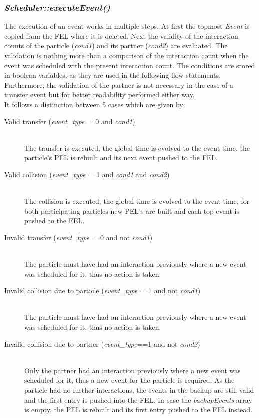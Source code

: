 \subsubsection{\quad \textit{Scheduler::executeEvent()}}
The execution of an event works in multiple steps. At first the topmost \textit{Event} is copied from the FEL where it is deleted. Next the validity of the interaction counts of the particle (\textit{cond1}) and its partner (\textit{cond2}) are evaluated. The validation is nothing more than a comparison of the interaction count when the event was scheduled with the present interaction count. The conditions are stored in boolean variables, as they are used in the following flow statements. Furthermore, the validation of the partner is not necessary in the case of a transfer event but for better readability performed either way.\\
It follows a distinction between 5 cases which are given by:
\begin{description}
\item[Valid transfer (\textit{event\_type}==0 and \textit{cond1}) ] \hfill \\ The transfer is executed, the global time is evolved to the event time, the particle's PEL is rebuilt and its next event pushed to the FEL.
\item[Valid collision (\textit{event\_type}==1 and \textit{cond1} and \textit{cond2}) ]\hfill \\ The collision is executed, the global time is evolved to the event time, for both participating particles new PEL's are built and each top event is pushed to the FEL.
\item[Invalid transfer (\textit{event\_type}==0 and not \textit{cond1})] \hfill \\ The particle must have had an interaction previously where a new event was scheduled for it, thus no action is taken.
\item[Invalid collision due to particle (\textit{event\_type}==1 and not \textit{cond1})] \hfill \\  The particle must have had an interaction previously where a new event was scheduled for it, thus no action is taken.
\item[Invalid collision due to partner (\textit{event\_type}==1 and not \textit{cond2})] \hfill \\  Only the partner had an interaction previously where a new event was scheduled for it, thus a new event for the particle is required. As the particle had no further interactions, the events in the backup are still valid and the first entry is pushed into the FEL. In case the \textit{backupEvents} array is empty, the PEL is rebuilt and its first entry pushed to the FEL instead.
\end{description}

